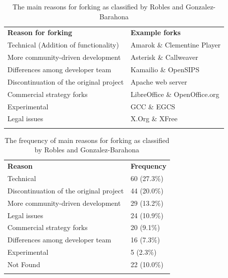 \documentclass[11pt]{report}
\begin{document}
\begin{table}[!ht]
\centering
\caption[The main reasons for forking]{The main reasons for forking as classified by Robles and Gonzalez-Barahona \cite{Robles}}
\label{tableReasonsForForking}
\begin{tabular}{p{} p{}}
\hline\noalign{\smallskip}
\textbf{Reason for forking} & \textbf{Example forks} \\
\noalign{\smallskip}\hline\noalign{\smallskip}
Technical (Addition of functionality) & Amarok \& Clementine Player \\ \hline
More community-driven development & Asterisk \& Callweaver \\ \hline
Differences among developer team & Kamailio \& OpenSIPS \\ \hline
Discontinuation of the original project & Apache web server \\ \hline
Commercial strategy forks & LibreOffice \& OpenOffice.org \\ \hline
Experimental & GCC \& EGCS \\ \hline
Legal issues & X.Org \& XFree\\
\noalign{\smallskip}\hline
\end{tabular}
\end{table}

\begin{table}[!ht]
\centering
\caption[The frequency of main reasons for forking]{The frequency of main reasons for forking as classified by Robles and Gonzalez-Barahona \cite{Robles}}
\label{tableReasonsForForkingFrequency}
\begin{tabular}{p{} p{}}
\hline\noalign{\smallskip}
\textbf{Reason} & \textbf{Frequency} \\
\noalign{\smallskip}\hline\noalign{\smallskip}
Technical & 60 (27.3\%)\\ \hline
Discontinuation of the original project & 44 (20.0\%)  \\ \hline
More community-driven development & 29 (13.2\%) \\ \hline
Legal issues &  24 (10.9\%) \\ \hline
Commercial strategy forks &  20 (9.1\%)  \\ \hline
Differences among developer team &  16 (7.3\%)  \\ \hline
Experimental &  5  (2.3\%) \\ \hline
Not Found &  22 (10.0\%) \\ 
\noalign{\smallskip}\hline
\end{tabular}
\end{table}
\end{document}
